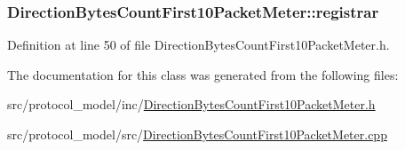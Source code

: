 \hypertarget{class_vsid_1_1_direction_bytes_count_first10_packet_meter_aa7ad6a3924823d09b01d75eeba69f039}{
\subsubsection[{registrar}]{ Direction\-Bytes\-Count\-First10\-Packet\-Meter\-::registrar\hspace{0.3cm}{\ttfamily [static]}}}\label{class_vsid_1_1_direction_bytes_count_first10_packet_meter_aa7ad6a3924823d09b01d75eeba69f039}


Definition at line 50 of file Direction\-Bytes\-Count\-First10\-Packet\-Meter.\-h.



The documentation for this class was generated from the following files\-:\begin{DoxyCompactItemize}
\item 
src/protocol\-\_\-model/inc/\hyperlink{_direction_bytes_count_first10_packet_meter_8h}{Direction\-Bytes\-Count\-First10\-Packet\-Meter.\-h}\item 
src/protocol\-\_\-model/src/\hyperlink{_direction_bytes_count_first10_packet_meter_8cpp}{Direction\-Bytes\-Count\-First10\-Packet\-Meter.\-cpp}\end{DoxyCompactItemize}
